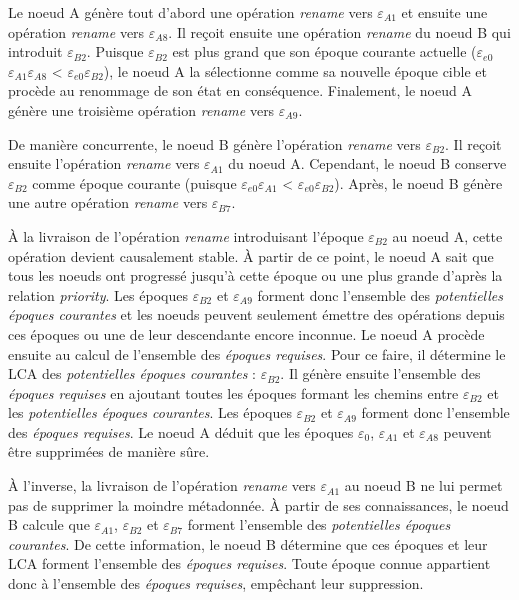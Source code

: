 \documentclass[12pt]{thesul}
\newcommand{\epoch}[1]{$\varepsilon_{#1}$}
\begin{document}
Le noeud A génère tout d'abord une opération \emph{rename} vers \epoch{A1} et ensuite une opération \emph{rename} vers \epoch{A8}.
Il reçoit ensuite une opération \emph{rename} du noeud B qui introduit \epoch{B2}.
Puisque \epoch{B2} est plus grand que son époque courante actuelle (\epoch{e0}\epoch{A1}\epoch{A8} < \epoch{e0}\epoch{B2}), le noeud A la sélectionne comme sa nouvelle époque cible et procède au renommage de son état en conséquence.
Finalement, le noeud A génère une troisième opération \emph{rename} vers \epoch{A9}.

De manière concurrente, le noeud B génère l'opération \emph{rename} vers \epoch{B2}.
Il reçoit ensuite l'opération \emph{rename} vers \epoch{A1} du noeud A.
Cependant, le noeud B conserve \epoch{B2} comme époque courante (puisque \epoch{e0}\epoch{A1} < \epoch{e0}\epoch{B2}).
Après, le noeud B génère une autre opération \emph{rename} vers \epoch{B7}.

À la livraison de l'opération \emph{rename} introduisant l'époque \epoch{B2} au noeud A, cette opération devient causalement stable.
À partir de ce point, le noeud A sait que tous les noeuds ont progressé jusqu'à cette époque ou une plus grande d'après la relation \emph{priority}.
Les époques \epoch{B2} et \epoch{A9} forment donc l'ensemble des \emph{potentielles époques courantes} et les noeuds peuvent seulement émettre des opérations depuis ces époques ou une de leur descendante encore inconnue.
Le noeud A procède ensuite au calcul de l'ensemble des \emph{époques requises}.
Pour ce faire, il détermine le \ac{LCA} des \emph{potentielles époques courantes} : \epoch{B2}.
Il génère ensuite l'ensemble des \emph{époques requises} en ajoutant toutes les époques formant les chemins entre \epoch{B2} et les \emph{potentielles époques courantes}.
Les époques \epoch{B2} et \epoch{A9} forment donc l'ensemble des \emph{époques requises}.
Le noeud A déduit que les époques \epoch{0}, \epoch{A1} et \epoch{A8} peuvent être supprimées de manière sûre.

À l'inverse, la livraison de l'opération \emph{rename} vers \epoch{A1} au noeud B ne lui permet pas de supprimer la moindre métadonnée.
À partir de ses connaissances, le noeud B calcule que \epoch{A1}, \epoch{B2} et \epoch{B7} forment l'ensemble des \emph{potentielles époques courantes}.
De cette information, le noeud B détermine que ces époques et leur \ac{LCA} forment l'ensemble des \emph{époques requises}.
Toute époque connue appartient donc à l'ensemble des \emph{époques requises}, empêchant leur suppression.
\end{document}
